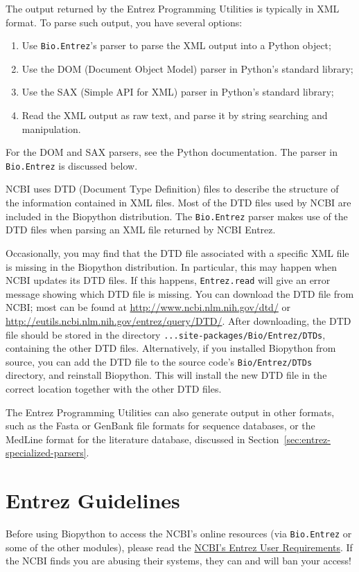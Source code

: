 \documentclass{report}
\begin{document}
The output returned by the Entrez Programming Utilities is typically in XML format. To parse such output, you have several options:
\begin{enumerate}
  \item Use \verb+Bio.Entrez+'s parser to parse the XML output into a Python object;
  \item Use the DOM (Document Object Model) parser in Python's standard library;
  \item Use the SAX (Simple API for XML) parser in Python's standard library;
  \item Read the XML output as raw text, and parse it by string searching and manipulation.
\end{enumerate}
For the DOM and SAX parsers, see the Python documentation. The parser in \verb+Bio.Entrez+ is discussed below.

NCBI uses DTD (Document Type Definition) files to describe the structure of the information contained in XML files. Most of the DTD files used by NCBI are included in the Biopython distribution. The \verb+Bio.Entrez+ parser makes use of the DTD files when parsing an XML file returned by NCBI Entrez.

Occasionally, you may find that the DTD file associated with a specific XML file is missing in the Biopython distribution. In particular, this may happen when NCBI updates its DTD files. If this happens, \verb+Entrez.read+ will give an error message showing which DTD file is missing.
You can download the DTD file from NCBI; most can be found at \url{http://www.ncbi.nlm.nih.gov/dtd/} or \url{http://eutils.ncbi.nlm.nih.gov/entrez/query/DTD/}.
After downloading, the DTD file should be stored in the directory \verb+...site-packages/Bio/Entrez/DTDs+, containing the other DTD files.  Alternatively, if you installed Biopython from source, you can add the DTD file to the source code's \verb+Bio/Entrez/DTDs+ directory, and reinstall Biopython. This will install the new DTD file in the correct location together with the other DTD files.

The Entrez Programming Utilities can also generate output in other formats, such as the Fasta or GenBank file formats for sequence databases, or the MedLine format for the literature database, discussed in Section~\ref{sec:entrez-specialized-parsers}.

\section{Entrez Guidelines}
\label{sec:entrez-guidelines}
Before using Biopython to access the NCBI's online resources (via \verb|Bio.Entrez| or some of the other modules), please read the \href{http://www.ncbi.nlm.nih.gov/entrez/query/static/eutils_help.html#UserSystemRequirements}{NCBI's Entrez User Requirements}.  If the NCBI finds you are abusing their systems, they can and will ban your access! 
\end{document}
